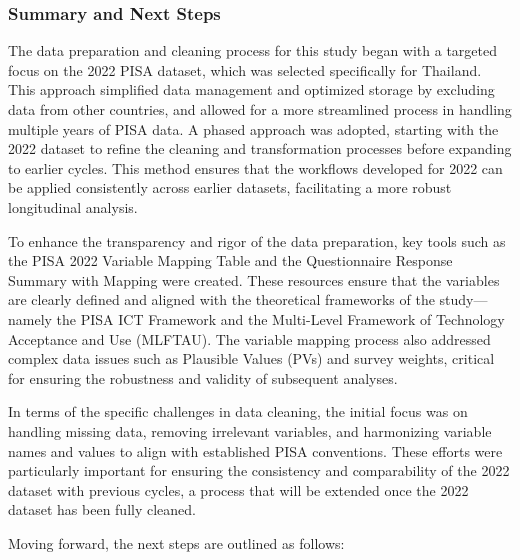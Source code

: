 \documentclass[
]{article}
\begin{document}
\hypertarget{summary-and-next-steps}{%
\subsubsection{Summary and Next Steps}\label{summary-and-next-steps}}

The data preparation and cleaning process for this study began with a
targeted focus on the 2022 PISA dataset, which was selected specifically
for Thailand. This approach simplified data management and optimized
storage by excluding data from other countries, and allowed for a more
streamlined process in handling multiple years of PISA data. A phased
approach was adopted, starting with the 2022 dataset to refine the
cleaning and transformation processes before expanding to earlier
cycles. This method ensures that the workflows developed for 2022 can be
applied consistently across earlier datasets, facilitating a more robust
longitudinal analysis.

To enhance the transparency and rigor of the data preparation, key tools
such as the PISA 2022 Variable Mapping Table and the Questionnaire
Response Summary with Mapping were created. These resources ensure that
the variables are clearly defined and aligned with the theoretical
frameworks of the study---namely the PISA ICT Framework and the
Multi-Level Framework of Technology Acceptance and Use (MLFTAU). The
variable mapping process also addressed complex data issues such as
Plausible Values (PVs) and survey weights, critical for ensuring the
robustness and validity of subsequent analyses.

In terms of the specific challenges in data cleaning, the initial focus
was on handling missing data, removing irrelevant variables, and
harmonizing variable names and values to align with established PISA
conventions. These efforts were particularly important for ensuring the
consistency and comparability of the 2022 dataset with previous cycles,
a process that will be extended once the 2022 dataset has been fully
cleaned.

Moving forward, the next steps are outlined as follows:
\end{document}
